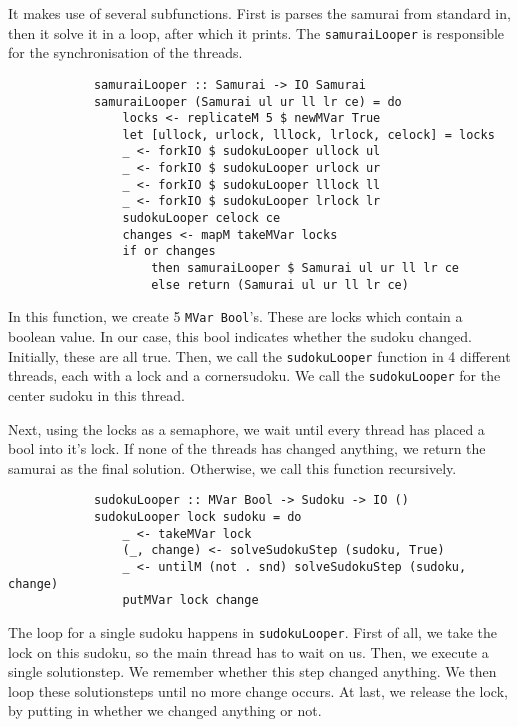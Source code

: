 \documentclass[a4paper,12pt]{article}
\begin{document}
\begin{section}
\begin{subsection}
\begin{subsubsection}
            It makes use of several subfunctions. First is parses the samurai
            from standard in, then it solve it in a loop, after which it prints.
            The \texttt{samuraiLooper} is responsible for the synchronisation
            of the threads.

            \begin{lstlisting}
            samuraiLooper :: Samurai -> IO Samurai
            samuraiLooper (Samurai ul ur ll lr ce) = do
                locks <- replicateM 5 $ newMVar True
                let [ullock, urlock, lllock, lrlock, celock] = locks
                _ <- forkIO $ sudokuLooper ullock ul
                _ <- forkIO $ sudokuLooper urlock ur
                _ <- forkIO $ sudokuLooper lllock ll
                _ <- forkIO $ sudokuLooper lrlock lr
                sudokuLooper celock ce
                changes <- mapM takeMVar locks
                if or changes
                    then samuraiLooper $ Samurai ul ur ll lr ce
                    else return (Samurai ul ur ll lr ce)
            \end{lstlisting}

            In this function, we create 5 \texttt{MVar Bool}'s. These are locks
            which contain a boolean value. In our case, this bool indicates
            whether the sudoku changed. Initially, these are all true. Then, we
            call the \texttt{sudokuLooper} function in 4 different threads, each
            with a lock and a cornersudoku. We call the \texttt{sudokuLooper}
            for the center sudoku in this thread.

            Next, using the locks as a semaphore, we wait until every thread has
            placed a bool into it's lock. If none of the threads has changed
            anything, we return the samurai as the final solution. Otherwise, we
            call this function recursively.

            \begin{lstlisting}
            sudokuLooper :: MVar Bool -> Sudoku -> IO ()
            sudokuLooper lock sudoku = do
                _ <- takeMVar lock
                (_, change) <- solveSudokuStep (sudoku, True)
                _ <- untilM (not . snd) solveSudokuStep (sudoku, change)
                putMVar lock change
            \end{lstlisting}

            The loop for a single sudoku happens in \texttt{sudokuLooper}. First
            of all, we take the lock on this sudoku, so the main thread has to
            wait on us. Then, we execute a single solutionstep. We remember
            whether this step changed anything. We then loop these solutionsteps
            until no more change occurs. At last, we release the lock, by
            putting in whether we changed anything or not.


\end{subsubsection}
\end{subsection}
\end{section}
\end{document}
